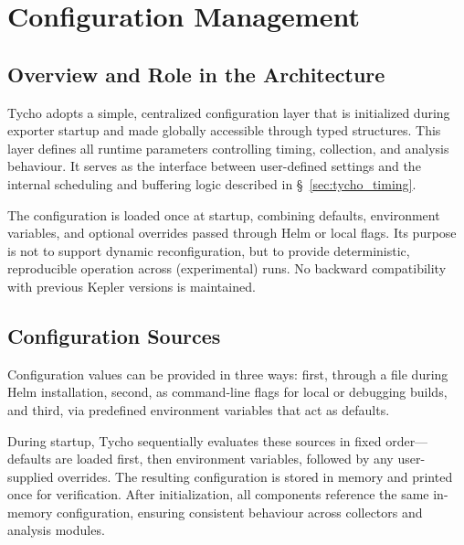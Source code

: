 \section{Configuration Management}
\label{subsec:tycho_config}

\subsection{Overview and Role in the Architecture}
\label{subsubsec:tycho_config_overview}

Tycho adopts a simple, centralized configuration layer that is initialized during exporter startup and made globally accessible through typed structures.
This layer defines all runtime parameters controlling timing, collection, and analysis behaviour.
It serves as the interface between user-defined settings and the internal scheduling and buffering logic described in \S~\ref{sec:tycho_timing}.

The configuration is loaded once at startup, combining defaults, environment variables, and optional overrides passed through Helm or local flags.
Its purpose is not to support dynamic reconfiguration, but to provide deterministic, reproducible operation across (experimental) runs.
No backward compatibility with previous Kepler versions is maintained.

\subsection{Configuration Sources}
\label{subsubsec:tycho_config_sources}

Configuration values can be provided in three ways:
first, through a  file during Helm installation,
second, as command-line flags for local or debugging builds,
and third, via predefined environment variables that act as defaults.

During startup, Tycho sequentially evaluates these sources in fixed order—
defaults are loaded first, then environment variables,
followed by any user-supplied overrides.
The resulting configuration is stored in memory and printed once for verification.
After initialization, all components reference the same in-memory configuration,
ensuring consistent behaviour across collectors and analysis modules.

